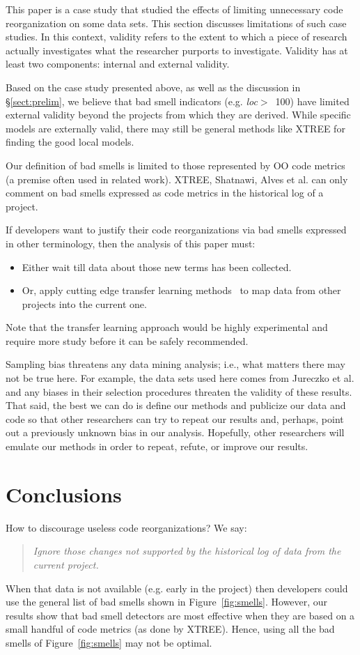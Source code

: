 \documentclass[twocolumn,5p]{elsarticle}
\newcommand{\tion}[1]{\S\ref{sect:#1}}
\newcommand{\fig}[1]{Figure~\ref{fig:#1}}
\theoremstyle{break}
\begin{document}
	This paper is a case study that studied the effects of  limiting 
	unnecessary code reorganization on some data sets. This section discusses 
	limitations of such case studies. In this context, validity refers to the 
	extent to which a piece of research actually
	investigates what the researcher purports to investigate.
	Validity has at least two components: internal and
	external validity.
	

	Based on the case study presented above,
	as well as the discussion in \tion{prelim},
	we believe that bad smell indicators (e.g. \mbox{{\em loc}$>$ 100})
	have limited external validity beyond the projects from which they are 
	derived.
	While specific models are externally valid,
	there may still be general methods like XTREE for finding the good local 
	models.
	
	Our definition of bad smells is limited to those represented by OO code 
	metrics (a premise often used in related work).
	XTREE, Shatnawi, Alves et al. can  only comment
	on bad smells   expressed as code metrics
	in the historical log of a project.
	
	If developers want to justify their code reorganizations
	via bad smells expressed in other terminology,
	then the  analysis of this paper must:
	\begin{itemize}
		\item Either wait till
		data about those new
		terms has been collected.
		\item Or, apply cutting edge transfer learning
		methods~\cite{Nam15,Jing15, krishna16} to map data from other projects
		into the current one.
	\end{itemize}
	Note that the transfer learning approach would
	be highly experimental and require more study
	before it can be safely recommended.
		
	Sampling bias threatens any data mining analysis; i.e., what matters
	there may not be true here. For example, the data sets used here comes 
	from 
	Jureczko et al. and any biases in their selection procedures
	threaten the validity of these results.
	That said,
	the best we can do is define our methods and publicize our data and code so 
	that other researchers can
	try to repeat our results and, perhaps, point out a previously unknown bias
	in our analysis. Hopefully, other researchers will emulate our methods in
	order to repeat, refute, or improve our results.
	
	
	\section{Conclusions}
	How to discourage useless code reorganizations?
	We say:
        \begin{quote}{\em Ignore those changes
            not supported by the historical log of data from
	the current project.}\end{quote}
	When that data is not available (e.g. early
	in the project) then developers could use the general list of
	bad smells shown in \fig{smells}. However,
	our results
	show that  bad smell detectors are most
	effective when they are based
	on a small handful of code metrics (as done by XTREE).
	Hence, using all the bad smells of \fig{smells} may not be optimal.
	
\end{document}

